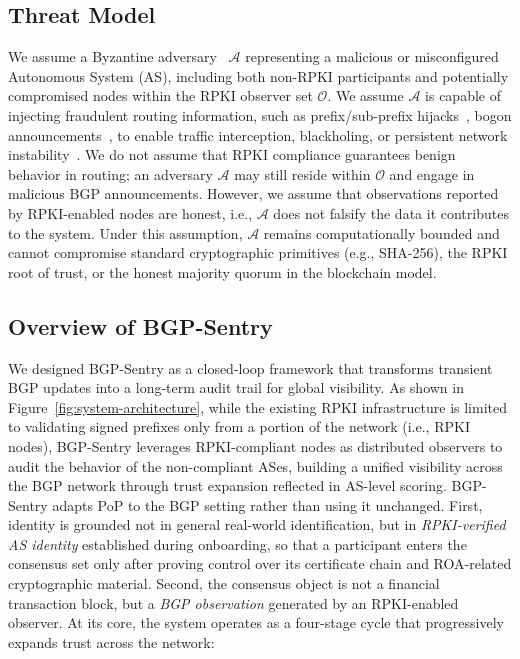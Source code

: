 \documentclass[conference]{IEEEtran}
\newcommand{\md}[1]{{\color{purple}#1}}
\begin{document}
\subsection{Threat Model}
\label{subsec:threat_model}
\md{We assume a Byzantine adversary~\cite{lamport2019byzantine} $\mathcal{A}$ representing a malicious or misconfigured Autonomous System (AS), including both non-RPKI participants and potentially compromised nodes within the RPKI observer set $\mathcal{O}$. We assume $\mathcal{A}$ is capable of injecting fraudulent routing information, such as prefix/sub-prefix hijacks~\cite{prefixHijacking}, bogon announcements~\cite{mao2003bgp}, to enable traffic interception, blackholing, or persistent network instability~\cite{butler2009survey}. We do not assume that RPKI compliance guarantees benign behavior in routing; an adversary $\mathcal{A}$ may still reside within $\mathcal{O}$ and engage in malicious BGP announcements. However, we assume that observations reported by RPKI-enabled nodes are honest, i.e., $\mathcal{A}$ does not falsify the data it contributes to the system. Under this assumption, $\mathcal{A}$ remains computationally bounded and cannot compromise standard cryptographic primitives (e.g., SHA-256), the RPKI root of trust, or the honest majority quorum in the blockchain model.}





\subsection{Overview of BGP-Sentry}
\label{subsec:defense_concept}

\md{We designed BGP-Sentry as a closed-loop framework that transforms transient BGP updates into a long-term audit trail for global visibility. As shown in Figure~\ref{fig:system-architecture}, while the existing RPKI infrastructure is limited to validating signed prefixes only from a portion of the network (i.e., RPKI nodes), BGP-Sentry leverages RPKI-compliant nodes as distributed observers to audit the behavior of the non-compliant ASes, building a unified visibility across the BGP network through trust expansion reflected in AS-level scoring. 
BGP-Sentry adapts PoP to the BGP setting rather than using it unchanged. First, identity is grounded not in general real-world identification, but in \emph{RPKI-verified AS identity} established during onboarding, so that a participant enters the consensus set only after proving control over its certificate chain and ROA-related cryptographic material. Second, the consensus object is not a financial transaction block, but a \emph{BGP observation} generated by an RPKI-enabled observer. 
At its core, the system operates as a four-stage cycle that progressively expands trust across the network:} 
\end{document}
